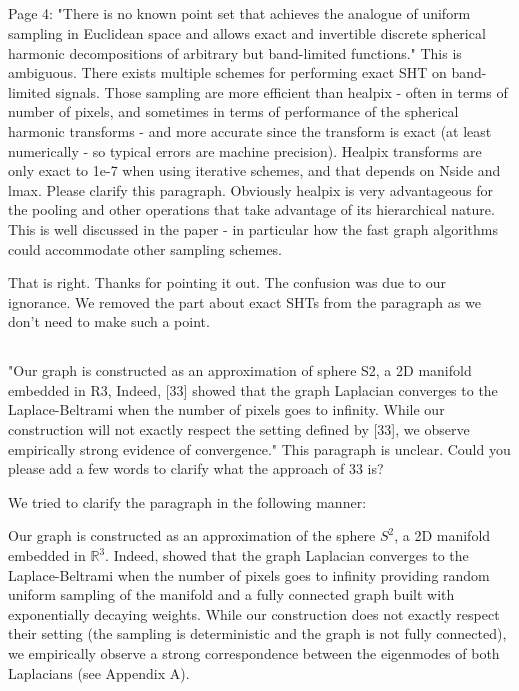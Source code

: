 \documentclass[12pt,a4paper]{article}
\newcommand{\mdeff}[1]{{\color[rgb]{.1,.6,.1}{MD: #1}}}
\newcommand{\1}{\b{1}}              %
\newcommand{\0}{\b{0}}              %
\begin{document}
\subsection{}
\begin{mdframed}[style=comment]
Page 4: "There is no known point set that achieves the analogue of uniform sampling in Euclidean space and allows exact and invertible discrete spherical harmonic decompositions of arbitrary but band-limited functions." This is ambiguous. There exists multiple schemes for performing exact SHT on band-limited signals. Those sampling are more efficient than healpix - often in terms of number of pixels, and sometimes in terms of performance of the spherical harmonic transforms - and more accurate since the transform is exact (at least numerically - so typical errors are machine precision). Healpix transforms are only exact to 1e-7 when using iterative schemes, and that depends on Nside and lmax. Please clarify this paragraph. Obviously healpix is very advantageous for the pooling and other operations that take advantage of its hierarchical nature. This is well discussed in the paper - in particular how the fast graph algorithms could accommodate other sampling schemes.
\end{mdframed}

That is right.
Thanks for pointing it out.
The confusion was due to our ignorance.
We removed the part about exact SHTs from the paragraph as we don't need to make such a point.


\subsection{}
\begin{mdframed}[style=comment]
"Our graph is constructed as an approximation of sphere S2, a 2D manifold embedded in R3, Indeed, [33] showed that the graph Laplacian converges to the Laplace-Beltrami when the number of pixels goes to infinity. While our construction will not exactly respect the setting defined by [33], we observe empirically strong evidence of convergence." This paragraph is unclear. Could you please add a few words to clarify what the approach of 33 is?
\end{mdframed}

We tried to clarify the paragraph in the following manner:
\begin{mdframed}[style=manuscript]
Our graph is constructed as an approximation of the sphere $S^2$, a 2D manifold embedded in $\mathbb{R}^3$.
Indeed, \cite{belkin2007convergence} showed that the graph Laplacian converges to the Laplace-Beltrami when the number of pixels goes to infinity providing random uniform sampling of the manifold and a fully connected graph built with exponentially decaying weights.
While our construction does not exactly respect their setting (the sampling is deterministic and the graph is not fully connected), we empirically observe a strong correspondence between the eigenmodes of both Laplacians (see Appendix A).
\end{mdframed}
\end{document}
